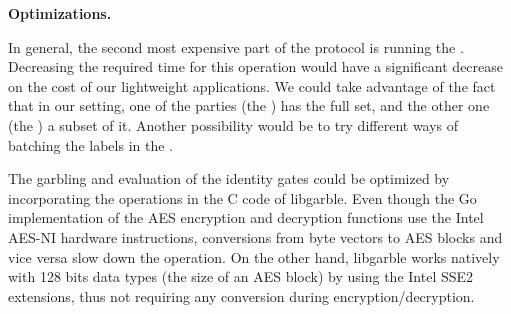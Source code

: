 \noindent\textbf{Optimizations.}

In general, the second most expensive part of the protocol is running the \PSI.
Decreasing the required time for this operation would have a significant
decrease on the cost of our lightweight applications.  We could take advantage
of the fact that in our \PSI setting, one of the parties (the \garbler) has the
full set, and the other one (the \broker) a subset of it.  Another possibility
would be to try different ways of batching the labels in the \PSI.

The garbling and evaluation of the identity gates could be optimized by
incorporating the operations in the C code of libgarble.  Even though the
Go implementation of the AES encryption and decryption functions use the
Intel AES-NI hardware instructions, conversions from byte vectors to AES blocks
and vice versa slow down the operation.  On the other hand, libgarble works
natively with 128 bits data types (the size of an AES block) by using the Intel
SSE2 extensions, thus not requiring any conversion during
encryption/decryption.


